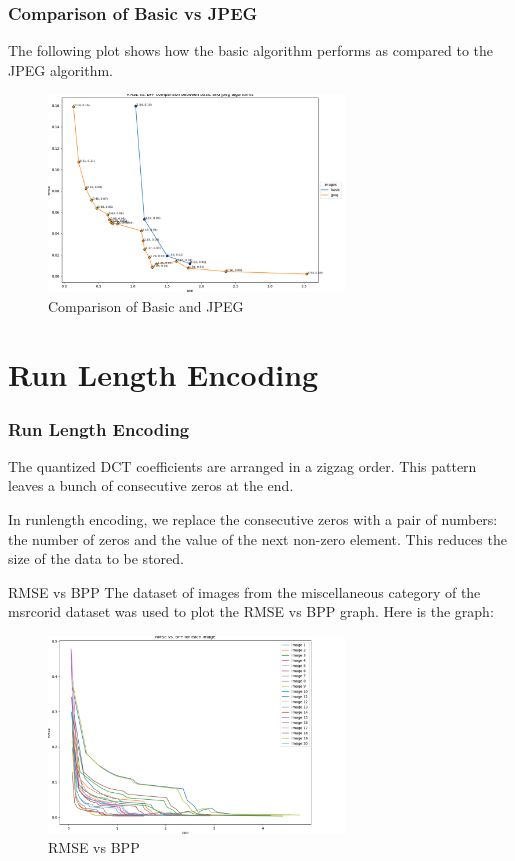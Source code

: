 \documentclass[Serif, 10pt, brown]{beamer}
\theoremstyle{example}
\theoremstyle{plain}
\begin{document}
\begin{frame}
	\frametitle{Comparison of Basic vs JPEG}
	The following plot shows how the basic algorithm performs as compared to the JPEG algorithm. 
	
	\begin{figure}
		\centering
		\includegraphics[width=0.7\textwidth]{../results/basic_jpeg_comparison.png}
		\caption{Comparison of Basic and JPEG}
	\end{figure}
\end{frame}

\section{Run Length Encoding}

\begin{frame}
	\frametitle{Run Length Encoding}
	The quantized DCT coefficients are arranged in a zigzag order. This pattern leaves a bunch of consecutive zeros at the end.

	\vspace{1cm}

	In runlength encoding, we replace the consecutive zeros with a pair of numbers: the number of zeros and the value of the next non-zero element. This reduces the size of the data to be stored.
\end{frame}

\begin{frame}{RMSE vs BPP}
	The dataset of images from the miscellaneous category of the msrcorid dataset was used to plot the RMSE vs BPP graph. Here is the graph:

	\begin{figure}
		\centering
		\includegraphics[width=0.7\textwidth]{../results/runlength.png}
		\caption{RMSE vs BPP}
	\end{figure}

\end{frame}
\end{document}
